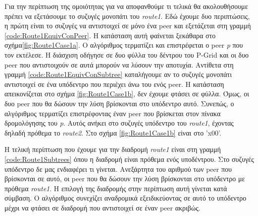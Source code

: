Για την περίπτωση της ομοιότητας για να αποφανθούμε τι τελικά θα ακολουθήσουμε 
πρέπει να εξετάσουμε το συζυγές μονοπάτι του \textit{route1}. Εδώ έχουμε δυο 
περιπτώσεις, η πρώτη είναι το συζυγές να αντιστοιχεί σε μόνο ένα peer και 
εξετάζεται στη γραμμή \ref{code:Route1EquivConPeer}. Η κατάσταση αυτή φαίνεται 
ξεκάθαρα στο σχήμα\ref{fig:Route1Case1a}. Ο αλγόριθμος τερματίζει και 
επιστρέφεται ο peer \textit{p} που τον εκτέλεσε. Η διάσχιση οδήγησε σε δυο 
φύλλα του δέντρου του P-Grid και οι δυο peer που αντιστοιχούν σε αυτά μπορούν 
να λύσουν την αποτυχία. Αντίθετα στη γραμμή \ref{code:Route1EquivConSubtree} 
καταλήγουμε αν το συζυγές μονοπάτι αντιστοιχεί σε ένα υπόδεντρο που περιέχει 
άνω του ενός peer. Η κατάσταση απεικονίζεται στο σχήμα \ref{fig:Route1Case1b}, 
δεν έχουμε φτάσει σε φύλλα. Όμως, οι δυο peer που θα δώσουν την λύση βρίσκονται 
στο υπόδεντρο αυτό. Συνεπώς, ο αλγόριθμος τερματίζει επιστρέφοντας έναν peer 
που βρίσκεται στον πίνακα δρομολόγησης του \textit{p}. Αυτός ανήκει στο συζυγές 
υπόδεντρο του \textit{route1}, έχοντας δηλαδή πρόθεμα το \textit{route2}. 
Στο σχήμα \ref{fig:Route1Case1b} είναι στο 'x00'. 

Η τελική περίπτωση που έχουμε για την διαδρομή \textit{route1} 
είναι στη γραμμή \ref{code:Route1Subtrees} όπου η διαδρομή είναι πρόθεμα ενός 
υποδέντρου. Στο συζυγές υπόδεντρο δε μας ενδιαφέρει τι γίνεται. 
Ανεξάρτητα του αριθμού των peer που βρίσκονται σε αυτό, οι peer που θα δώσουν 
την λύση βρίσκονται στο υπόδεντρο με πρόθεμα \textit{route1}. 
Η επιλογή της διαδρομής στην περίπτωση αυτή γίνεται κατά σύμβαση. Ο αλγόριθμος 
συνεχίζει αναδρομικά εξειδικεύοντας σε αυτό το υπόδεντρο μέχρι να φτάσει σε 
διαδρομή που αντιστοιχεί σε έναν peer ακριβώς. 

